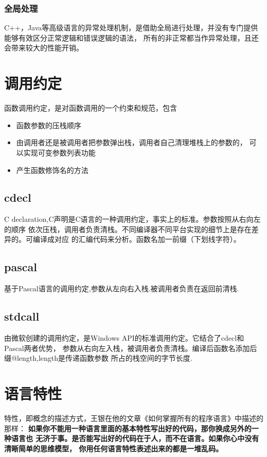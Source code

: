 \subsubsection{全局处理}
C++，Java等高级语言的异常处理机制，是借助全局进行处理，并没有专门提供能够有效区分正常逻辑和错误逻辑的语法，
所有的非正常都当作异常处理，且还会带来较大的性能开销。

\section{调用约定}
函数调用约定，是对函数调用的一个约束和规范，包含
\begin{itemize}
    \item {函数参数的压栈顺序}
    \item {由调用者还是被调用者把参数弹出栈，调用者自己清理堆栈上的参数的，
    可以实现可变参数列表功能}
    \item {产生函数修饰名的方法}
\end{itemize}

\subsection{cdecl}
C declaration,C声明是C语言的一种调用约定，事实上的标准。参数按照从右向左的顺序
依次压栈，调用者负责清栈。不同编译器不同平台实现的细节上是存在差异的。可编译成对应
的汇编代码来分析。函数名加一前缀（下划线字符）。

\subsection{pascal}
基于Pascal语言的调用约定,参数从左向右入栈.被调用者负责在返回前清栈.

\subsection{stdcall}
由微软创建的调用约定，是Windows API的标准调用约定。它结合了cdecl和Pascal两者优势，
参数从右向左入栈，被调用者负责清栈。编译后函数名添加后缀@length,length是传递函数参数
所占的栈空间的字节长度.

\section{语言特性}
特性，即概念的描述方式，王银在他的文章《如何掌握所有的程序语言》中描述的那样：
\textbf{如果你不能用一种语言里面的基本特性写出好的代码，那你换成另外的一种语言也
无济于事。是否能写出好的代码在于人，而不在语言。如果你心中没有清晰简单的思维模型，
你用任何语言特性表述出来的都是一堆乱码。}


